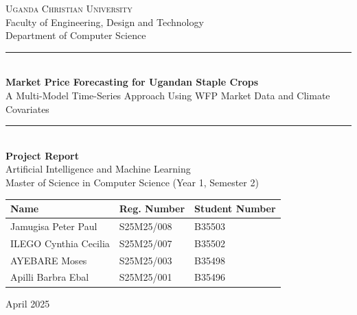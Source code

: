 \documentclass[12pt,a4paper]{article}
\begin{document}
\begin{titlepage}
\centering
\vspace*{1.5cm}

{\Large\textsc{Uganda Christian University}}\\[0.3cm]
{\large Faculty of Engineering, Design and Technology}\\[0.2cm]
{\large Department of Computer Science}\\[1cm]

\rule{\textwidth}{1.5pt}\\[0.4cm]
{\LARGE\bfseries Market Price Forecasting for Ugandan Staple Crops}\\[0.2cm]
{\large A Multi-Model Time-Series Approach Using WFP Market Data and Climate Covariates}\\[0.2cm]
\rule{\textwidth}{1.5pt}\\[1.5cm]

{\large\textbf{Project Report}}\\[0.3cm]
{\large Artificial Intelligence and Machine Learning}\\[0.3cm]
{\large Master of Science in Computer Science (Year 1, Semester 2)}\\[2cm]

\begin{tabular}{lll}
\textbf{Name} & \textbf{Reg. Number} & \textbf{Student Number} \\
\midrule
Jamugisa Peter Paul & S25M25/008 & B35503 \\
ILEGO Cynthia Cecilia & S25M25/007 & B35502 \\
AYEBARE Moses & S25M25/003 & B35498 \\
Apilli Barbra Ebal & S25M25/001 & B35496 \\
\end{tabular}

\vfill
{\large April 2025}
\end{titlepage}
\end{document}
